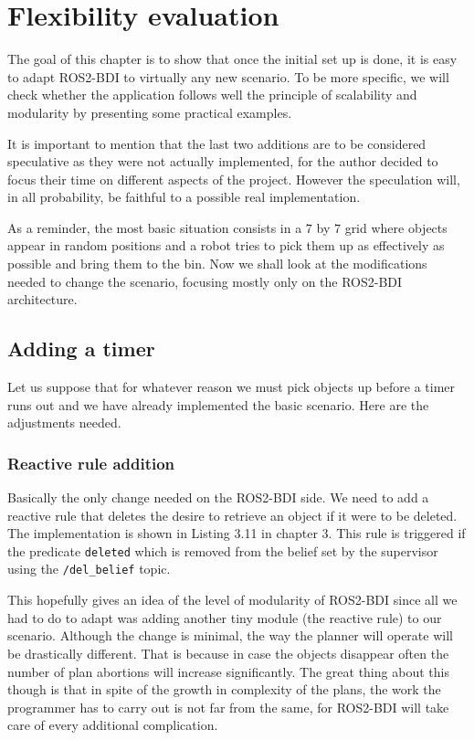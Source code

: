 \chapter{Flexibility evaluation} 
The goal of this chapter is to show that once the initial set up is done, it is easy to adapt ROS2-BDI to virtually any new scenario. To be more specific, we will check whether the application follows well the principle of scalability and modularity by presenting some practical examples.
\par 
It is important to mention that the last two additions are to be considered speculative as they were not actually implemented, for the author decided to focus their time on different aspects of the project. However the speculation will, in all probability, be faithful to a possible real implementation. 
\par
As a reminder, the most basic situation consists in a $7$ by $7$ grid where objects appear in random positions and a robot tries to pick them up as effectively as possible and bring them to the bin. Now we shall look at the modifications needed to change the scenario, focusing mostly only on the ROS2-BDI architecture.

\section{Adding a timer}
Let us suppose that for whatever reason we must pick objects up before a timer runs out and we have already implemented the basic scenario. Here are the adjustments needed.

\subsection{Reactive rule addition} Basically the only change needed on the ROS2-BDI side. We need to add a reactive rule that deletes the desire to retrieve an object if it were to be deleted. The implementation is shown in Listing 3.11 in chapter 3. This rule is triggered if the predicate \texttt{deleted} which is removed from the belief set by the supervisor using the \texttt{/del\_belief} topic.
\par
This hopefully gives an idea of the level of modularity of ROS2-BDI since all we had to do to adapt was adding another tiny module (the reactive rule) to our scenario. Although the change is minimal, the way the planner will operate will be drastically different. That is because in case the objects disappear often the number of plan abortions will increase significantly. The great thing about this though is that in spite of the growth in complexity of the plans, the work the programmer has to carry out is not far from the same, for ROS2-BDI will take care of every additional complication.

